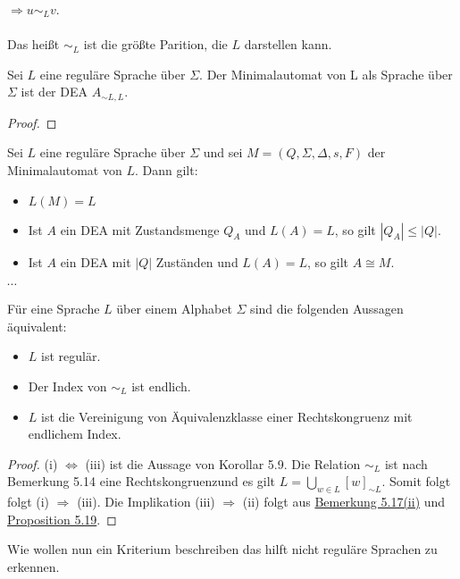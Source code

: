 $\Rightarrow u \sim_L v$.\\\\

Das heißt $\sim_L$ ist die größte Parition, die $L$ darstellen kann.

 Sei $L$ eine reguläre Sprache über $\Sigma$. Der Minimalautomat von L als Sprache über $\Sigma$ ist der DEA $A_{\sim L, L}$.

\begin{proof}
  
\end{proof}

 Sei $L$ eine reguläre Sprache über $\Sigma$ und sei $M = (Q, \Sigma, \Delta, s, F)$ der Minimalautomat von $L$. Dann gilt:
\begin{itemize}
  \item [(i)] $L(M) = L$
  \item [(ii)] Ist $A$ ein DEA mit Zustandsmenge $Q_A$ und $L(A) = L$, so gilt $|Q_A| \leq |Q|$.
  \item [(iii)] Ist $A$ ein DEA mit $|Q|$ Zuständen und $L(A) = L$, so gilt $A \cong M$. 
\end{itemize}

$\cdots$

Für eine Sprache $L$ über einem Alphabet $\Sigma$ sind die folgenden Aussagen äquivalent:
\begin{itemize}
  \item [(i)] $L$ ist regulär.
  \item [(ii)] Der Index von $\sim_{L}$ ist endlich.
  \item [(iii)] $L$ ist die Vereinigung von Äquivalenzklasse einer Rechtskongruenz mit endlichem Index.
\end{itemize}

\begin{proof}
  (i) $\Leftrightarrow$ (iii) ist die Aussage von Korollar 5.9. Die Relation $\sim_L$ ist nach Bemerkung 5.14 eine Rechtskongruenzund es gilt $L = \bigcup \limits_{w \in L} [w]_{\sim L}$. Somit folgt folgt (i) $\Rightarrow$ (iii). Die Implikation (iii) $\Rightarrow$ (ii) folgt aus \hyperref[subsec:5.17]{Bemerkung 5.17(ii)} und \hyperref[subsec:5.19]{Proposition 5.19}.
\end{proof}

Wie wollen nun ein Kriterium beschreiben das hilft nicht reguläre Sprachen zu erkennen.

